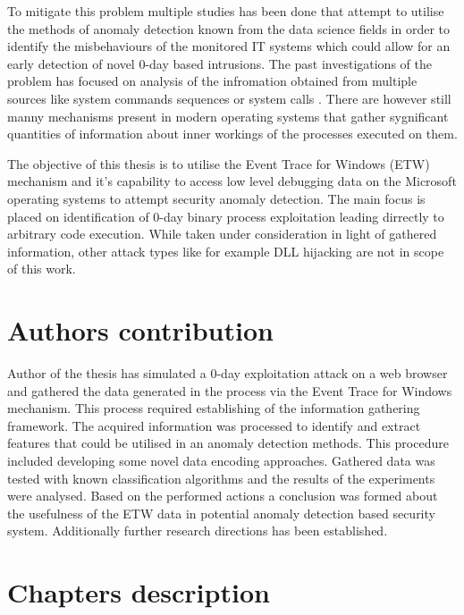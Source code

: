 \documentclass[a4paper,twoside,12pt]{book}
\begin{document}
To mitigate this problem multiple studies has been done that attempt to utilise the methods of
anomaly detection known from the data science fields in order to identify the misbehaviours of 
the monitored IT systems which could allow for an early detection of novel 0-day based intrusions.
The past investigations of the problem has focused on analysis of the infromation obtained from 
multiple sources like system commands sequences \cite{bib:lane1997application} or system calls 
\cite{bib:rsvm}. There are however still manny mechanisms present in modern operating systems 
that gather sygnificant quantities of information about inner workings of the processes executed
on them. 

The objective of this thesis is to utilise the Event Trace for Windows (ETW) mechanism and it's 
capability to access low level debugging data on the Microsoft operating systems to attempt
security anomaly detection. The main focus is placed on identification of 0-day binary process 
exploitation leading dirrectly to arbitrary code execution. While taken under consideration in
light of gathered information, other attack types like for example DLL hijacking are not in 
scope of this work.

\section{Authors contribution}

Author of the thesis has simulated a 0-day exploitation attack on a web browser and gathered 
the data generated in the process via the Event Trace for Windows mechanism. This process 
required establishing of the information gathering framework. The acquired 
information was processed to identify and extract features that could be utilised in an anomaly detection
methods. This procedure included developing some novel data encoding approaches. Gathered data
was tested with known classification algorithms and the results of the experiments were analysed.
Based on the performed actions a conclusion was formed about the usefulness of the ETW data
in potential anomaly detection based security system. Additionally further research directions
has been established.

\section{Chapters description}
\end{document}

